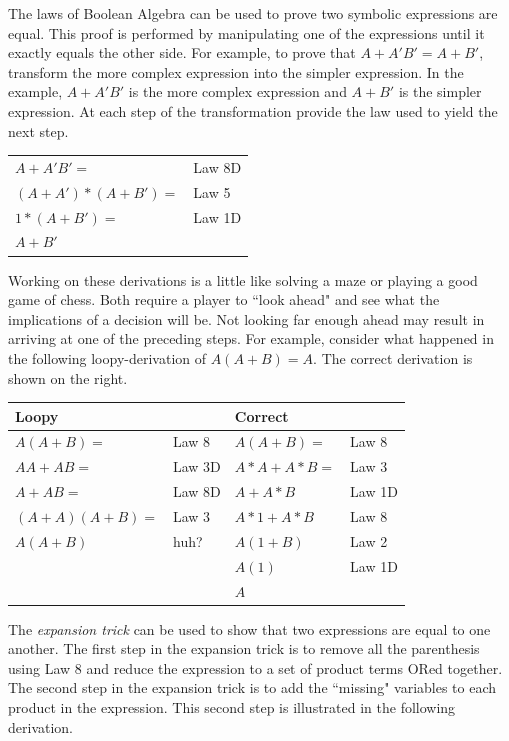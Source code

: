 The laws of Boolean Algebra can be used to prove two symbolic expressions are 
equal.  This proof is performed by manipulating one of the expressions until it
exactly equals the other side.  For example, to prove that $A + A'B' = A + B'$,
transform the more complex expression into the simpler
expression.  In the example, $A+A'B'$ is the more complex expression and $A+B'$
is the simpler expression.  At each step of the transformation 
provide the law used to yield the next step.

\begin{tabular}[ht]{ll}
$A + A'B' =$		& Law 8D \\
$(A+A')*(A+B')=$	& Law 5 \\
$1*(A+B')=$ 		& Law 1D \\
$A+B'$ \\
\end{tabular}

Working on these derivations is a little like solving a maze or playing
a good game of chess.  Both require a player to ``look ahead" and see what the 
implications of a decision will be.  Not looking far enough ahead may
result in arriving at one of the preceding steps.  For example, consider what 
happened in the following loopy-derivation of $A(A+B)=A$.  The correct 
derivation is shown on the right.

\begin{tabular}[ht]{ll|ll}
Loopy		&		& Correct	&		\\ \hline
$A(A+B)=$ 	& Law 8	& $A(A+B)=$ & Law 8	\\ 
$AA + AB=$ 	& Law 3D	& $A*A+A*B=$& Law 3	\\ 
$A+AB=$	& Law 8D	& $A+A*B$ 	& Law 1D	\\ 
$(A+A)(A+B)=$& Law 3	& $A*1+A*B$	& Law 8	\\ 
$A(A+B)$	& huh?	& $A(1+B)$	& Law 2	\\
		&		& $A(1)$	& Law 1D	\\
		&		& $A$		& \\
\end{tabular}

The {\it expansion trick} can be used to show that two expressions are 
equal to one another.
  The first step in the expansion trick is
to remove all the parenthesis using Law 8 and reduce the expression
to a set of product terms ORed together. The second step in the 
expansion trick is to add the ``missing" variables to each product 
in the expression.  This second step is illustrated in the following
derivation.

